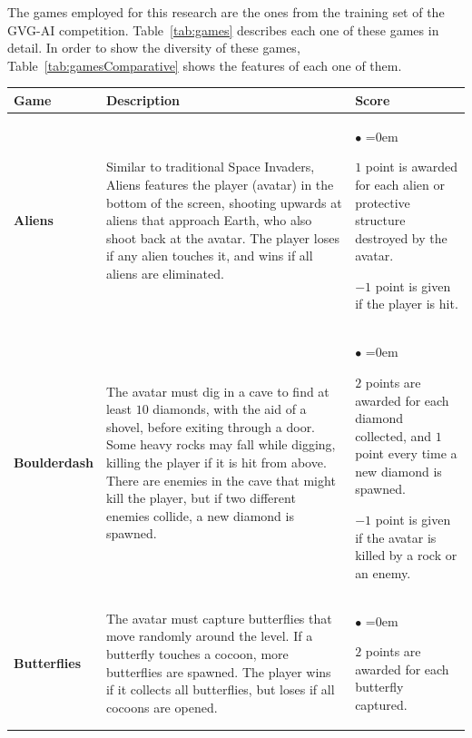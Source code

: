 \documentclass[conference]{IEEEtran}
\begin{document}
The games employed for this research are the ones from the training set of the GVG-AI competition. Table~\ref{tab:games} describes each one of these games in detail. In order to show the diversity of these games, Table~\ref{tab:gamesComparative} shows the features of each one of them. 


\begin{table}[!t]
\begin{center}
\begin{tabular}{|m{1.4cm}|m{8cm}|m{6cm}|}
\hline
\textbf{Game}  & \textbf{Description} & \textbf{Score} \\ 
\hline
\textbf{Aliens} & Similar to traditional Space Invaders, Aliens features the player (avatar) in the bottom of the screen, shooting upwards at aliens that approach Earth, who also shoot back at the avatar. The player loses if any alien touches it, and wins if all aliens are eliminated. & \begin{list}{$\bullet$}{\leftmargin=2pt \itemindent=0em} \item $1$ point is awarded for each alien or protective structure destroyed by the avatar. \item $-1$ point is given if the player is hit. \end{list} \\
\hline
\textbf{Boulderdash} & The avatar must dig in a cave to find at least $10$ diamonds, with the aid of a shovel, before exiting through a door. Some heavy rocks may fall while digging, killing the player if it is hit from above. There are enemies in the cave that might kill the player, but if two different enemies collide, a new diamond is spawned.& \begin{list}{$\bullet$}{\leftmargin=2pt \itemindent=0em} \item $2$ points are awarded for each diamond collected, and $1$ point every time a new diamond is spawned. \item $-1$ point is given if the avatar is killed by a rock or an enemy. \end{list} \\
\hline
\textbf{Butterflies} & The avatar must capture butterflies that move randomly around the level. If a butterfly touches a cocoon, more butterflies are spawned. The player wins if it collects all butterflies, but loses if all cocoons are opened. & \begin{list}{$\bullet$}{\leftmargin=2pt \itemindent=0em} \item $2$ points are awarded for each butterfly captured. \end{list} \\

\end{tabular}
\end{center}
\end{table}
\end{document}
